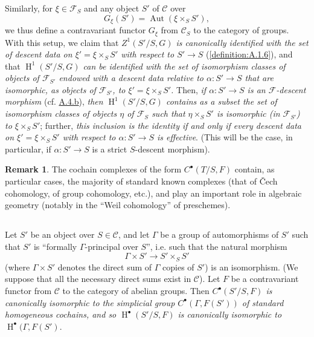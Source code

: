 \documentclass{article}
\theoremstyle{plain}
\theoremstyle{definition}
\newenvironment{example}[1]
  {\renewcommand\theinnercustomexample{#1}\innercustomexample}
  {\endinnercustomexample}
\newtheorem*{remark*}{Remark}
\newcommand{\sh}[1]{{\mathscr{#1}}}
\newcommand{\cat}[1]{{\mathcal{#1}}}
\DeclareMathOperator{\Aut}{Aut}
\DeclareMathOperator{\HH}{H}
\newcommand{\oldpage}[1]{\marginpar{\footnotesize$\Big\vert$ \textit{p.~#1}}}
\begin{document}
Similarly, for $\xi\in\sh{F}_S$ and any object $S'$ of $\cat{C}$ over
\[
  G_\xi(S') = \Aut(\xi\times_S S'),
\]
we thus define a contravariant functor $G_\xi$ from $\cat{C}_S$ to the category of
\oldpage{190-14}
groups.
With this setup, we claim that \emph{$Z^1(S'/S,G)$ is canonically identified with the set of descent data on $\xi'=\xi\times_S S'$ with respect to $S'\to S$} (\cref{definition:A.1.6}), and that \emph{$\HH^1(S'/S,G)$ can be identified with the set of isomorphism classes of objects of $\sh{F}_{S'}$ endowed with a descent data relative to $\alpha\colon S'\to S$ that are isomorphic, as objects of $\sh{F}_{S'}$, to $\xi'=\xi\times_S S'$.}
Then, \emph{if $\alpha\colon S'\to S$ is an $\sh{F}$-descent morphism} (cf. \hyperref[A.4.b]{A.4.b}), \emph{then $\HH^1(S'/S,G)$ contains as a subset the set of isomorphism classes of objects $\eta$ of $\sh{F}_S$ such that $\eta\times_S S'$ is isomorphic (in $\sh{F}_{S'}$) to $\xi\times_S S'$};
further, \emph{this inclusion is the identity if and only if every descent data on $\xi'=\xi\times_S S'$ with respect to $\alpha\colon S'\to S$ is effective}.
(This will be the case, in particular, if $\alpha\colon S'\to S$ is a strict $S$-descent morphism).

\begin{remark*}
  The cochain complexes of the form $C^\bullet(T/S,F)$ contain, as particular cases, the majority of standard known complexes (that of \v{C}ech cohomology, of group cohomology, etc.), and play an important role in algebraic geometry (notably in the ``Weil cohomology'' of preschemes).
\end{remark*}


\subsection{}
\label{A.4.d}

\begin{example}{1}
\label{example:A.4.d}
  Let $S'$ be an object over $S\in\cat{C}$, and let $\Gamma$ be a group of automorphisms of $S'$ such that $S'$ is ``formally $\Gamma$-principal over $S$'', i.e. such that the natural morphism
  \[
    \Gamma\times S' \to S'\times_S S'
  \]
  (where $\Gamma\times S'$ denotes the direct sum of $\Gamma$ copies of $S'$) is an isomorphism.
  (We suppose that all the necessary direct sums exist in $\cat{C}$).
  Let $F$ be a contravariant functor from $\cat{C}$ to the category of abelian groups.
  Then \emph{$C^\bullet(S'/S,F)$ is canonically isomorphic to the simplicial group $C^\bullet(\Gamma,F(S'))$ of standard homogeneous cochains, and so $\HH^\bullet(S'/S,F)$ is canonically isomorphic to $\HH^\bullet(\Gamma,F(S')$}.
\end{example}
\end{document}

